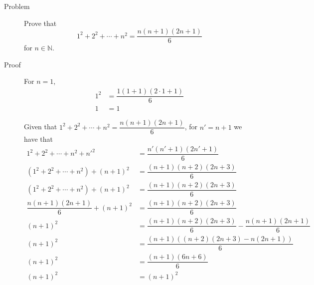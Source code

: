 \begin{description}
\item[Problem] Prove that
$$1^2 + 2^2 + \cdots + n^2 = \dfrac{n(n+1)(2n+1)}{6}$$
for $n \in \mathbb{N}$.

\item[Proof] For $n = 1$,
\begin{equation*}\begin{aligned}
1^2 &= \dfrac{1(1 + 1)(2 \cdot 1 + 1)}{6} \\
1   &= 1
\end{aligned}\end{equation*}

Given that $1^2 + 2^2 + \cdots + n^2 = \dfrac{n(n+1)(2n+1)}{6}$, for $n' = n +
1$ we have that
\begin{equation*}\begin{aligned}
1^2 + 2^2 + \cdots + n^2 + n'^2 &= \dfrac{n'(n'+1)(2n'+1)}{6} \\
(1^2 + 2^2 + \cdots + n^2) + (n+1)^2 &= \dfrac{(n+1)(n+2)(2n+3)}{6} \\
(1^2 + 2^2 + \cdots + n^2) + (n+1)^2 &= \dfrac{(n+1)(n+2)(2n+3)}{6} \\
\dfrac{n(n+1)(2n+1)}{6} + (n+1)^2 &= \dfrac{(n+1)(n+2)(2n+3)}{6} \\
(n+1)^2 &= \dfrac{(n+1)(n+2)(2n+3)}{6} - \dfrac{n(n+1)(2n+1)}{6} \\
(n+1)^2 &= \dfrac{(n+1)\left((n+2)(2n+3) - n(2n+1)\right)}{6} \\
(n+1)^2 &= \dfrac{(n+1)\left(6n + 6\right)}{6} \\
(n+1)^2 &= (n+1)^2
\end{aligned}\end{equation*}

\end{description}
